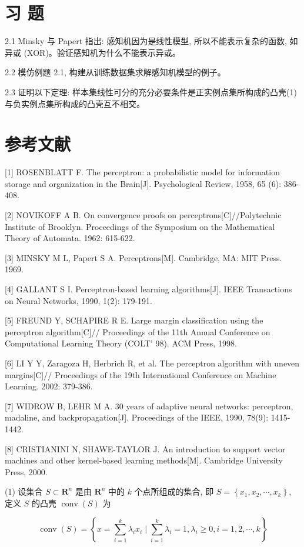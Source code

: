 \documentclass[10pt]{article}
\begin{document}
\section*{习 题}
2.1 Minsky 与 Papert 指出: 感知机因为是线性模型, 所以不能表示复杂的函数, 如异或 (XOR)。验证感知机为什么不能表示异或。

2.2 模仿例题 2.1, 构建从训练数据集求解感知机模型的例子。

2.3 证明以下定理: 样本集线性可分的充分必要条件是正实例点集所构成的凸壳(1)与负实例点集所构成的凸壳互不相交。

\section*{参考文献}
[1] ROSENBLATT F. The perceptron: a probabilistic model for information storage and organization in the Brain[J]. Psychological Review, 1958, 65 (6): 386-408.

[2] NOVIKOFF A B. On convergence proofs on perceptrons[C]//Polytechnic Institute of Brooklyn. Proceedings of the Symposium on the Mathematical Theory of Automata. 1962: 615-622.

[3] MINSKY M L, Papert S A. Perceptrons[M]. Cambridge, MA: MIT Press. 1969.

[4] GALLANT S I. Perceptron-based learning algorithms[J]. IEEE Transactions on Neural Networks, 1990, 1(2): 179-191.

[5] FREUND Y, SCHAPIRE R E. Large margin classification using the perceptron algorithm[C]// Proceedings of the 11th Annual Conference on Computational Learning Theory (COLT' 98). ACM Press, 1998.

[6] LI Y Y, Zaragoza H, Herbrich R, et al. The perceptron algorithm with uneven margins[C]// Proceedings of the 19th International Conference on Machine Learning. 2002: 379-386.

[7] WIDROW B, LEHR M A. 30 years of adaptive neural networks: perceptron, madaline, and backpropagation[J]. Proceedings of the IEEE, 1990, 78(9): 1415-1442.

[8] CRISTIANINI N, SHAWE-TAYLOR J. An introduction to support vector machines and other kernel-based learning methods[M]. Cambridge University Press, 2000.

(1) 设集合 $S \subset \boldsymbol{R}^{n}$ 是由 $\boldsymbol{R}^{n}$ 中的 $k$ 个点所组成的集合, 即 $S=\left\{x_{1}, x_{2}, \cdots, x_{k}\right\}$, 定义 $S$ 的凸壳 $\operatorname{conv}(S)$ 为

$$
\operatorname{conv}(S)=\left\{x=\sum_{i=1}^{k} \lambda_{i} x_{i} \mid \sum_{i=1}^{k} \lambda_{i}=1, \lambda_{i} \geqslant 0, i=1,2, \cdots, k\right\}
$$
\end{document}
